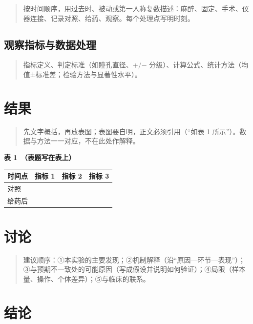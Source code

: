 \documentclass{fdureport}
\begin{document}
\begin{quote}
按时间顺序，用过去时、被动或第一人称复数描述：麻醉、固定、手术、仪器连接、记录对照、给药、观察。每个处理点写明时刻。
\end{quote}

\hypertarget{ux89c2ux5bdfux6307ux6807ux4e0eux6570ux636eux5904ux7406}{%
\subsection{观察指标与数据处理}\label{ux89c2ux5bdfux6307ux6807ux4e0eux6570ux636eux5904ux7406}}

\begin{quote}
指标定义、判定标准（如瞳孔直径、+/−
分级）、计算公式、统计方法（均值±标准差；检验方法与显著性水平）。
\end{quote}

\hypertarget{ux7ed3ux679c}{%
\section{结果}\label{ux7ed3ux679c}}

\begin{quote}
先文字概括，再放表图；表图要自明，正文必须引用（``如表 1
所示''）。数据与方法一一对应，不在此处作解释。
\end{quote}

\textbf{表 1　（表题写在表上）}

\begin{longtable}[]{@{}lccc@{}}
\toprule\noalign{}
时间点 & 指标 1 & 指标 2 & 指标 3 \\
\midrule\noalign{}
\endhead
\bottomrule\noalign{}
\endlastfoot
对照 & & & \\
给药后 & & & \\
\end{longtable}

\hypertarget{ux8ba8ux8bba}{%
\section{讨论}\label{ux8ba8ux8bba}}

\begin{quote}
建议顺序：①本实验的主要发现；②机制解释（沿``原因---环节---表现''）；③与预期不一致处的可能原因（写成假设并说明如何验证）；④局限（样本量、操作、个体差异）；⑤与临床的联系。
\end{quote}

\hypertarget{ux7ed3ux8bba}{%
\section{结论}\label{ux7ed3ux8bba}}
\end{document}
